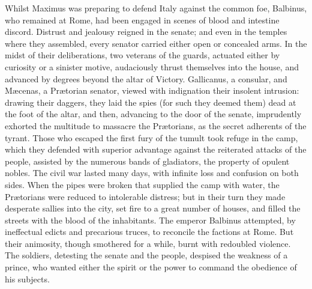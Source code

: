 Whilst Maximus was preparing to defend Italy against the common
foe, Balbinus, who remained at Rome, had been engaged in scenes
of blood and intestine discord. Distrust and jealousy reigned in
the senate; and even in the temples where they assembled, every
senator carried either open or concealed arms. In the midst of
their deliberations, two veterans of the guards, actuated either
by curiosity or a sinister motive, audaciously thrust themselves
into the house, and advanced by degrees beyond the altar of
Victory. Gallicanus, a consular, and Mæcenas, a Prætorian
senator, viewed with indignation their insolent intrusion:
drawing their daggers, they laid the spies (for such they deemed
them) dead at the foot of the altar, and then, advancing to the
door of the senate, imprudently exhorted the multitude to
massacre the Prætorians, as the secret adherents of the tyrant.
Those who escaped the first fury of the tumult took refuge in the
camp, which they defended with superior advantage against the
reiterated attacks of the people, assisted by the numerous bands
of gladiators, the property of opulent nobles. The civil war
lasted many days, with infinite loss and confusion on both sides.
When the pipes were broken that supplied the camp with water, the
Prætorians were reduced to intolerable distress; but in their
turn they made desperate sallies into the city, set fire to a
great number of houses, and filled the streets with the blood of
the inhabitants. The emperor Balbinus attempted, by ineffectual
edicts and precarious truces, to reconcile the factions at Rome.
But their animosity, though smothered for a while, burnt with
redoubled violence. The soldiers, detesting the senate and the
people, despised the weakness of a prince, who wanted either the
spirit or the power to command the obedience of his subjects.\footnotemark[40]


